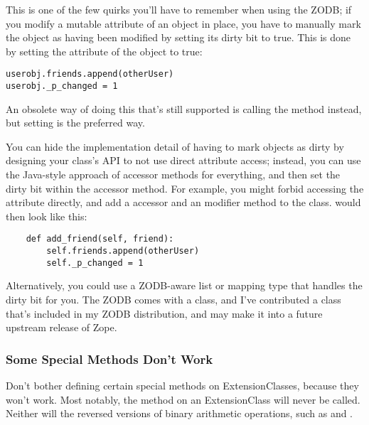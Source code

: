 This is one of the few quirks you'll have to remember when using the
ZODB; if you modify a mutable attribute of an object in place, you
have to manually mark the object as having been modified by setting
its dirty bit to true.  This is done by setting the
 attribute of the object to true:

\begin{verbatim}
userobj.friends.append(otherUser)
userobj._p_changed = 1
\end{verbatim}

An obsolete way of doing this that's still supported is calling the
 method instead, but setting  
is the preferred way.

You can hide the implementation detail of having to mark objects as
dirty by designing your class's API to not use direct attribute
access; instead, you can use the Java-style approach of accessor
methods for everything, and then set the dirty bit within the accessor
method.  For example, you might forbid accessing the 
attribute directly, and add a  accessor and
an  modifier method to the class.  
would then look like this:

\begin{verbatim}
    def add_friend(self, friend):
        self.friends.append(otherUser)
        self._p_changed = 1
\end{verbatim}

Alternatively, you could use a ZODB-aware list or mapping type that
handles the dirty bit for you.  The ZODB comes with a
 class, and I've contributed a
 class that's included in my ZODB distribution, 
and may make it into a future upstream release of Zope.


\subsubsection{Some Special Methods Don't Work}

Don't bother defining certain special methods on
ExtensionClasses, because they won't work.  Most notably, the
 method on an ExtensionClass will never be called.
Neither will the reversed versions of binary arithmetic operations,
such as  and .

